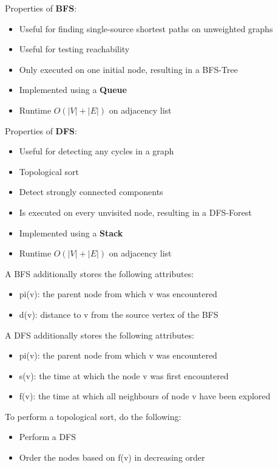 \documentclass{article}
\begin{document}
\begin{lm}
Properties of \textbf{BFS}:
\begin{itemize}
    \item Useful for finding single-source shortest paths on unweighted graphs
    \item Useful for testing reachability
    \item Only executed on one initial node, resulting in a BFS-Tree
    \item Implemented using a \textbf{Queue}
    \item Runtime $ O(|V| + |E|) $ on adjacency list
\end{itemize}
\end{lm}

\begin{lm}
Properties of \textbf{DFS}:
\begin{itemize}
    \item Useful for detecting any cycles in a graph
    \item Topological sort
    \item Detect strongly connected components
    \item Is executed on every unvisited node, resulting in a DFS-Forest
    \item Implemented using a \textbf{Stack}
    \item Runtime $ O(|V| + |E|) $ on adjacency list
\end{itemize}
\end{lm}

\begin{crll}
A BFS additionally stores the following attributes:
\begin{itemize}
    \item pi(v): the parent node from which v was encountered
    \item d(v): distance to v from the source vertex of the BFS
\end{itemize}
A DFS additionally stores the following attributes:
\begin{itemize}
    \item pi(v): the parent node from which v was encountered
    \item s(v): the time at which the node v was first encountered
    \item f(v): the time at which all neighbours of node v have been explored
\end{itemize}
\end{crll}

\begin{thm}
To perform a topological sort, do the following:
\begin{itemize}
    \item Perform a DFS
    \item Order the nodes based on f(v) in decreasing order
\end{itemize}
\end{thm}
\end{document}
